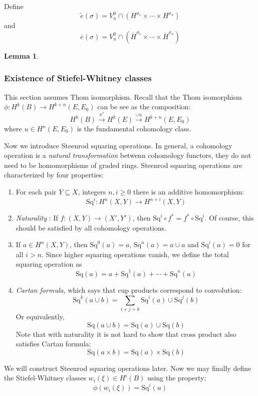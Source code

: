 \documentclass[12pt]{article}
\theoremstyle{plain}
\newtheorem{lemma}[equation]{Lemma}
\theoremstyle{definition}
\newcommand{\<}{\langle}
\renewcommand{\>}{\rangle}
\def\wt{\widetilde}
\newcommand{\wb}{\overline}
\newcommand{\Sq}{\mathrm{Sq}}
\begin{document}
Define $$\wt{e}(\sigma) = V_n^0 \cap (H^{\sigma_1} \times \cdots \times H^{\sigma_n})$$ and $$ \wb{e}(\sigma) = V_n^0 \cap (\wb{H}^{\sigma_1} \times \cdots \times \wb{H}^{\sigma_n})$$

\begin{lemma}
\end{lemma}

\subsubsection{Existence of Stiefel-Whitney classes}
This section assumes Thom isomorphism. Recall that the Thom isomorphism $\phi : H^k(B) \to H^{k + n} (E, E_0)$ can be see as the composition: 
$$ H^k(B) \stackrel{\pi^*}{\longrightarrow} H^k(E) \stackrel{\cup u}{\longrightarrow} H^{k + n}(E, E_0)$$ where $u \in H^n(E, E_0)$ is the fundamental cohomology class. 

Now we introduce Steenrod squaring operations. In general, a cohomology operation is a \textit{natural transformation} betwenn cohomology functors, they do not need to be homomorphisms of graded rings. Steenrod squaring operations are characterized by four properties:
\begin{enumerate}
\item For each pair $Y \subseteq X$, integers $n, i \ge 0$ there is an additive homomorphism:
$$ \Sq^i : H^n(X, Y) \to H^{n + i}(X, Y) $$
\item \textit{Naturality} : If $f : (X, Y) \to (X', Y')$, then $\Sq^i \circ f^*  = f^* \circ \Sq^i$. Of course, this should be satisfied by all cohomology operations. 
\item If $a \in H^n(X, Y)$, then $\Sq^0(a) = a$, $\Sq^n(a) = a \cup a$ and $\Sq^i(a) = 0$ for all $i > n$. Since higher squaring operations vanish, we define the total squaring operation as 
$$ \Sq(a) = a + \Sq^1(a) + \cdots + \Sq^n(a) $$
\item \textit{Cartan formula}, which says that cup products correspond to convolution:
$$ \Sq^k (a \cup b) = \sum_{i + j = k} \Sq^i(a) \cup \Sq^j(b) $$ Or equivalently, 
$$ \Sq(a \cup b) = \Sq(a) \cup \Sq(b) $$ Note that with naturality it is not hard to show that cross product also satisfies Cartan formula: 
$$ \Sq(a \times b) = \Sq(a) \times \Sq(b) $$
\end{enumerate}
We will construct Steenrod squaring operations later. Now we may finally define the Stiefel-Whitney classes $w_i(\xi) \in H^i(B)$ using the property:
$$ \phi(w_i(\xi)) = \Sq^i(u) $$
\end{document}

